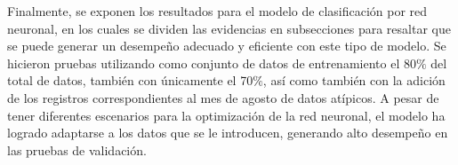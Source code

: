 Finalmente, se exponen los resultados para el modelo de clasificación por red neuronal, en los cuales se dividen las evidencias en subsecciones para resaltar que se puede generar un desempeño adecuado y eficiente con este 
tipo de modelo. Se hicieron pruebas utilizando como conjunto de datos de entrenamiento el 80$\%$ del total de datos, también con únicamente el 70$\%$, así como también con la adición de los registros correspondientes al 
mes de agosto de datos atípicos. A pesar de tener diferentes escenarios para la optimización de la red neuronal, el modelo ha logrado adaptarse a los datos que se le introducen, generando alto desempeño en las pruebas de 
validación.

\clearpage

